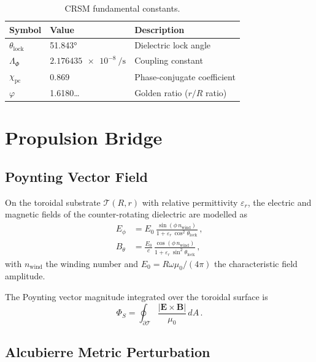 \documentclass[aps,preprint,superscriptaddress,longbibliography]{revtex4-2}
\begin{document}
\begin{table}[H]
\centering
\caption{CRSM fundamental constants.}
\label{tab:constants}
\begin{tabular}{lll}
\toprule
Symbol & Value & Description \\
\midrule
$\theta_{\mathrm{lock}}$ & \ang{51.843} & Dielectric lock angle \\
$\Lambda_\Phi$ & $\SI{2.176435e-8}{\per\second}$ & Coupling constant \\
$\chi_{\mathrm{pc}}$ & 0.869 & Phase-conjugate coefficient \\
$\varphi$ & 1.6180\ldots & Golden ratio ($r/R$ ratio) \\
\bottomrule
\end{tabular}
\end{table}

\section{Propulsion Bridge}
\label{sec:propulsion}

\subsection{Poynting Vector Field}

On the toroidal substrate $\mathcal{T}(R, r)$ with relative
permittivity $\varepsilon_r$, the electric and magnetic fields of
the counter-rotating dielectric are modelled as
\begin{align}
E_\phi &= E_0\,\frac{\sin(\phi\,n_{\mathrm{wind}})}
{1 + \varepsilon_r\,\cos^2\theta_{\mathrm{lock}}}\,,
\label{eq:Ephi}\\
B_\theta &= \frac{E_0}{c}\,
\frac{\cos(\phi\,n_{\mathrm{wind}})}
{1 + \varepsilon_r\,\sin^2\theta_{\mathrm{lock}}}\,,
\label{eq:Btheta}
\end{align}
with $n_{\mathrm{wind}}$ the winding number and
$E_0 = R\omega\mu_0 / (4\pi)$ the characteristic field
amplitude.

The Poynting vector magnitude integrated over the toroidal surface
is
\begin{equation}
\Phi_S = \oint_{\partial\mathcal{T}}
\frac{|\mathbf{E}\times\mathbf{B}|}{\mu_0}\,dA\,.
\label{eq:PhiS}
\end{equation}

\subsection{Alcubierre Metric Perturbation}
\end{document}
